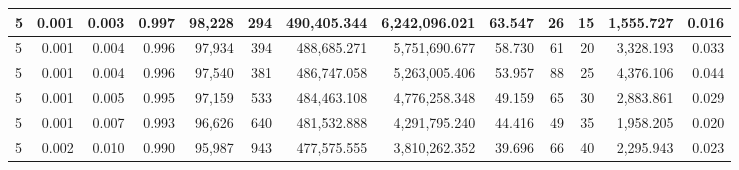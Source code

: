 \documentclass[fontsize=11pt]{article}
\begin{document}
\begin{landscape}
\begin{table}[]
\begin{tabular}{lrrrrrrrrrr|r|r|}
\multicolumn{1}{|l|}{5} & \multicolumn{1}{r|}{0.001} & \multicolumn{1}{r|}{0.003} & \multicolumn{1}{r|}{0.997} & \multicolumn{1}{r|}{98,228}  & \multicolumn{1}{r|}{294}    & \multicolumn{1}{r|}{490,405.344} & \multicolumn{1}{r|}{6,242,096.021} & \multicolumn{1}{r|}{63.547} & \multicolumn{1}{r|}{26}    & 15                     & 1,555.727                                & 0.016                               \\ \hline
\multicolumn{1}{|l|}{5} & \multicolumn{1}{r|}{0.001} & \multicolumn{1}{r|}{0.004} & \multicolumn{1}{r|}{0.996} & \multicolumn{1}{r|}{97,934}  & \multicolumn{1}{r|}{394}    & \multicolumn{1}{r|}{488,685.271} & \multicolumn{1}{r|}{5,751,690.677} & \multicolumn{1}{r|}{58.730} & \multicolumn{1}{r|}{61}    & 20                     & 3,328.193                                & 0.033                               \\ \hline
\multicolumn{1}{|l|}{5} & \multicolumn{1}{r|}{0.001} & \multicolumn{1}{r|}{0.004} & \multicolumn{1}{r|}{0.996} & \multicolumn{1}{r|}{97,540}  & \multicolumn{1}{r|}{381}    & \multicolumn{1}{r|}{486,747.058} & \multicolumn{1}{r|}{5,263,005.406} & \multicolumn{1}{r|}{53.957} & \multicolumn{1}{r|}{88}    & 25                     & 4,376.106                                & 0.044                               \\ \hline
\multicolumn{1}{|l|}{5} & \multicolumn{1}{r|}{0.001} & \multicolumn{1}{r|}{0.005} & \multicolumn{1}{r|}{0.995} & \multicolumn{1}{r|}{97,159}  & \multicolumn{1}{r|}{533}    & \multicolumn{1}{r|}{484,463.108} & \multicolumn{1}{r|}{4,776,258.348} & \multicolumn{1}{r|}{49.159} & \multicolumn{1}{r|}{65}    & 30                     & 2,883.861                                & 0.029                               \\ \hline
\multicolumn{1}{|l|}{5} & \multicolumn{1}{r|}{0.001} & \multicolumn{1}{r|}{0.007} & \multicolumn{1}{r|}{0.993} & \multicolumn{1}{r|}{96,626}  & \multicolumn{1}{r|}{640}    & \multicolumn{1}{r|}{481,532.888} & \multicolumn{1}{r|}{4,291,795.240} & \multicolumn{1}{r|}{44.416} & \multicolumn{1}{r|}{49}    & 35                     & 1,958.205                                & 0.020                               \\ \hline
\multicolumn{1}{|l|}{5} & \multicolumn{1}{r|}{0.002} & \multicolumn{1}{r|}{0.010} & \multicolumn{1}{r|}{0.990} & \multicolumn{1}{r|}{95,987}  & \multicolumn{1}{r|}{943}    & \multicolumn{1}{r|}{477,575.555} & \multicolumn{1}{r|}{3,810,262.352} & \multicolumn{1}{r|}{39.696} & \multicolumn{1}{r|}{66}    & 40                     & 2,295.943                                & 0.023                               \\ \hline

\end{tabular}
\end{table}
\end{landscape}
\end{document}

